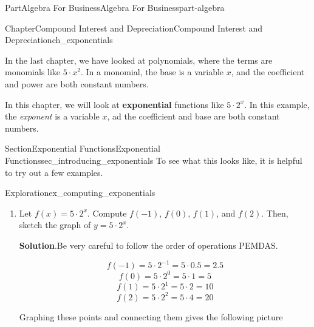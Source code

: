 \documentclass{tufte-book}
\newcommand{\blocktitlefont}{\relax}
\newcommand{\terminology}[1]{\textbf{#1}}
\numberwithin{equation}{chapter}
\begin{document}
\begin{partptx}{Part}{Algebra For Business}{}{Algebra For Business}{}{}{part-algebra}
%
\typeout{************************************************}
\typeout{************************************************}
%
\begin{chapterptx}{Chapter}{Compound Interest and Depreciation}{}{Compound Interest and Depreciation}{}{}{ch_exponentials}
\renewcommand*{\chaptername}{Chapter}
\begin{introduction}{}%
In the last chapter, we have looked at polynomials, where the terms are monomials like \(5\cdot x^2\). In a monomial, the base is a variable \(x\), and the coefficient and power are both  constant numbers.%
\par
In this chapter, we will look at \terminology{exponential} functions like \(5\cdot 2^x\). In this example, the \emph{exponent} is a variable \(x\), ad the coefficient and base are both constant numbers.%
\end{introduction}%
%
%
\typeout{************************************************}
\typeout{************************************************}
%
\begin{sectionptx}{Section}{Exponential Functions}{}{Exponential Functions}{}{}{sec_introducing_exponentials}
To see what this looks like, it is helpful to try out a few examples.%
\begin{exploration}{Exploration}{}{ex_computing_exponentials}%
\begin{enumerate}[font=\bfseries,label=(\alph*),ref=\alph*]%
\item{}Let \(f(x) = 5\cdot 2^x\). Compute  \(f(-1)\), \(f(0)\), \(f(1)\), and \(f(2)\). Then, sketch the graph of \(y=5\cdot 2^x\).%
\par\smallskip%
\noindent\textbf{\blocktitlefont Solution}.\hypertarget{ex_computing_exponentials-1-2}{}\quad{}Be very careful to follow the order of operations PEMDAS.%
\par
%
\begin{equation*}
f(-1) = 5\cdot 2^{-1} = 5 \cdot 0.5 = 2.5
\end{equation*}
%
\begin{equation*}
f(0) = 5\cdot 2^{0} = 5 \cdot 1 = 5
\end{equation*}
%
\begin{equation*}
f(1) = 5\cdot 2^{1} = 5 \cdot 2 = 10
\end{equation*}
%
\begin{equation*}
f(2) = 5\cdot 2^{2} = 5 \cdot 4 = 20
\end{equation*}
%
\par
Graphing these points and connecting them gives the following picture%
\begin{image}{0.25}{0.5}{0.25}{}%
\end{image}
\end{enumerate}
\end{exploration}
\end{sectionptx}
\end{chapterptx}
\end{partptx}
\end{document}
